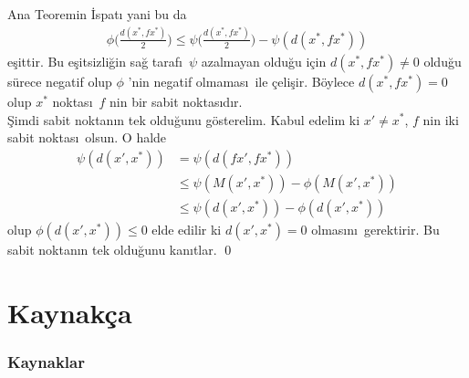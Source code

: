 \documentclass[8pt]{beamer}
\begin{document}
\begin{frame}
  \begin{block}{Ana Teoremin \.{I}spat\i }
    yani bu da
    \begin{align}
      \phi\bigg(\frac{d(x^*,fx^*)}{2}\bigg)  \leq \psi\bigg(\frac{d(x^*,fx^*)}{2}\bigg)-\psi(d(x^*,fx^*))
    \end{align}
e\c{s}ittir. Bu e\c{s}itsizli\u{g}in sa\u{g} taraf\i\ $\psi$ azalmayan oldu\u{g}u i\c{c}in $d(x^*,fx^*)\neq 0$ oldu\u{g}u s\"urece  negatif  olup $\phi$ 'nin negatif olmamas\i\ ile \c{c}eli\c{s}ir. B\"oylece $d(x^*,fx^*)=0$ olup $x^*$ noktas\i\ $f$ nin bir sabit noktas\i d\i r.\\
\vspace{10pt}
\hspace{5pt} \c{S}imdi sabit noktan\i n tek oldu\u{g}unu g\"osterelim. Kabul edelim ki $x'\neq x^*$, $f$ nin iki sabit noktas\i\ olsun. O halde 
   \begin{align}
     \psi(d(x',x^*))&=\psi(d(fx',fx^*))\\
      &\leq \psi(M(x',x^*))-\phi(M(x',x^*))\\
      & \leq \psi(d(x',x^*))-\phi(d(x',x^*))
   \end{align}
olup $\phi(d(x',x^*))\leq 0$ elde edilir ki $d(x',x^*)=0$ olmas\i n\i\ gerektirir. Bu sabit noktan\i n tek oldu\u{g}unu kan\i tlar. \qed
  \end{block}
\end{frame} %

\section{Kaynak\c{c}a}
\begin{frame}
\frametitle{Kaynaklar}


\nocite{*}



\end{frame}
\end{document}
